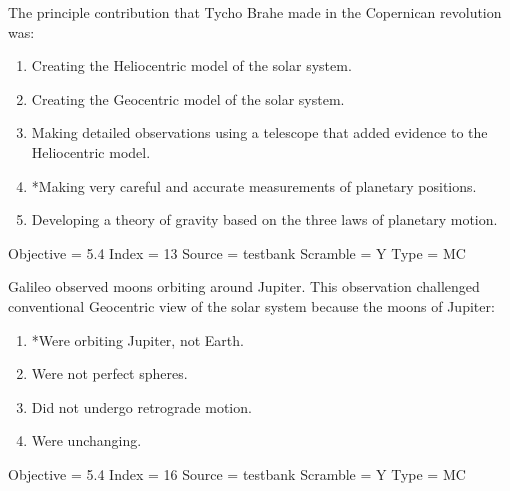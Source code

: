 \documentclass[11pt]{article}
\begin{document}
\begin{enumerate}
\begin{minipage}{\textwidth}
\begin{minipage}{\textwidth}
\item The principle contribution that Tycho Brahe made in the Copernican revolution was:
\begin{enumerate} 
\setlength{\itemsep}{1pt} 
\setlength{\parskip}{0pt} 
\setlength{\parsep}{0pt}
\setlength{\multicolsep}{1pt} 
\item Creating the Heliocentric model of the solar system.
\item Creating the Geocentric model of the solar system.
\item Making detailed observations using a telescope that added evidence to the Heliocentric model.
\item *Making very careful and accurate measurements of planetary positions.
\item Developing a theory of gravity based on the three laws of planetary motion.
\end{enumerate} 
Objective = 5.4
Index = 13
Source = testbank
Scramble = Y
Type = MC
\end{minipage}
\end{minipage}
\vskip 0.20in

\begin{minipage}{\textwidth}
\begin{minipage}{\textwidth}
\item Galileo observed moons orbiting around Jupiter.    This observation challenged conventional Geocentric view of the solar system because the moons of Jupiter:
\begin{multicols}{2}
\begin{enumerate} 
\setlength{\itemsep}{1pt} 
\setlength{\parskip}{0pt} 
\setlength{\parsep}{0pt}
\setlength{\multicolsep}{1pt} 
\item *Were orbiting Jupiter, not Earth.
\item Were not perfect spheres.
\item Did not undergo retrograde motion.
\item Were unchanging.
\end{enumerate} 
\vfill 
\end{multicols}

Objective = 5.4
Index = 16
Source = testbank
Scramble = Y
Type = MC
\end{minipage}
\end{minipage}
\vskip 0.20in


\end{enumerate}
\end{document}
